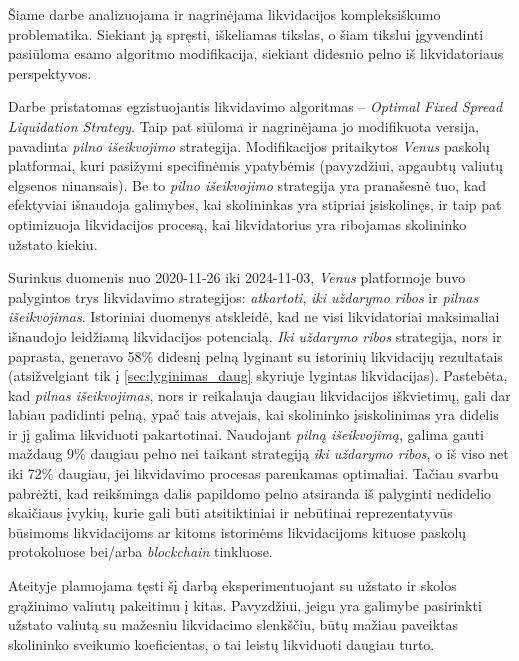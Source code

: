 \documentclass{VUMIFPSkursinis}
\begin{document}
Šiame darbe analizuojama ir nagrinėjama likvidacijos kompleksiškumo problematika. Siekiant ją spręsti, iškeliamas tikslas, o šiam tikslui įgyvendinti pasiūloma esamo algoritmo modifikacija, siekiant didesnio pelno iš likvidatoriaus perspektyvos.

Darbe pristatomas egzistuojantis likvidavimo algoritmas – \textit{Optimal Fixed Spread Liquidation Strategy}. Taip pat siūloma ir nagrinėjama jo modifikuota versija, pavadinta \textit{pilno išeikvojimo} strategija. Modifikacijos pritaikytos \textit{Venus} paskolų platformai, kuri pasižymi specifinėmis ypatybėmis (pavyzdžiui, apgaubtų valiutų elgsenos niuansais). Be to \textit{pilno išeikvojimo} strategija yra pranašesnė tuo, kad efektyviai išnaudoja galimybes, kai skolininkas yra stipriai įsiskolinęs, ir taip pat optimizuoja likvidacijos procesą, kai likvidatorius yra ribojamas skolininko užstato kiekiu.

Surinkus duomenis nuo 2020-11-26 iki 2024-11-03, \textit{Venus} platformoje buvo palygintos trys likvidavimo strategijos: \textit{atkartoti}, \textit{iki uždarymo ribos} ir \textit{pilnas išeikvojimas}. Istoriniai duomenys atskleidė, kad ne visi likvidatoriai maksimaliai išnaudojo leidžiamą likvidacijos potencialą. \textit{Iki uždarymo ribos} strategija, nors ir paprasta, generavo 58\% didesnį pelną lyginant su istorinių likvidacijų rezultatais (atsižvelgiant tik į \ref{sec:lyginimas_daug} skyriuje lygintas likvidacijas). Pastebėta, kad \textit{pilnas išeikvojimas}, nors ir reikalauja daugiau likvidacijos iškvietimų, gali dar labiau padidinti pelną, ypač tais atvejais, kai skolininko įsiskolinimas yra didelis ir jį galima likviduoti pakartotinai. Naudojant \textit{pilną išeikvojimą}, galima gauti maždaug 9\% daugiau pelno nei taikant strategiją \textit{iki uždarymo ribos}, o iš viso net iki 72\% daugiau, jei likvidavimo procesas parenkamas optimaliai. Tačiau svarbu pabrėžti, kad reikšminga dalis papildomo pelno atsiranda iš palyginti nedidelio skaičiaus įvykių, kurie gali būti atsitiktiniai ir nebūtinai reprezentatyvūs būsimoms likvidacijoms ar kitoms istorinėms likvidacijoms kituose paskolų protokoluose bei/arba \textit{blockchain} tinkluose.

Ateityje planuojama tęsti šį darbą eksperimentuojant su užstato ir skolos grąžinimo valiutų pakeitimu į kitas. Pavyzdžiui, jeigu yra galimybe pasirinkti užstato valiutą su mažesniu likvidacimo slenkščiu, būtų mažiau paveiktas skolininko sveikumo koeficientas, o tai leistų likviduoti daugiau turto.

\printbibliography[heading=bibintoc] %

\end{document}
